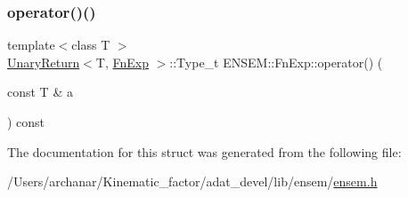 \mbox{\label{structENSEM_1_1FnExp_a10f95f4422549fc30c1eacde6618fdcf}} 
\subsubsection{\texorpdfstring{operator()()}{operator()()}\hspace{0.1cm}{\footnotesize\ttfamily [2/2]}}
{\footnotesize\ttfamily template$<$class T $>$ \\
\mbox{\hyperlink{structENSEM_1_1UnaryReturn}{Unary\+Return}}$<$T, \mbox{\hyperlink{structENSEM_1_1FnExp}{Fn\+Exp}} $>$\+::Type\+\_\+t E\+N\+S\+E\+M\+::\+Fn\+Exp\+::operator() (\begin{DoxyParamCaption}\item[{const T \&}]{a }\end{DoxyParamCaption}) const\hspace{0.3cm}{\ttfamily [inline]}}



The documentation for this struct was generated from the following file\+:\begin{DoxyCompactItemize}
\item 
/\+Users/archanar/\+Kinematic\+\_\+factor/adat\+\_\+devel/lib/ensem/\mbox{\hyperlink{lib_2ensem_2ensem_8h}{ensem.\+h}}\end{DoxyCompactItemize}
